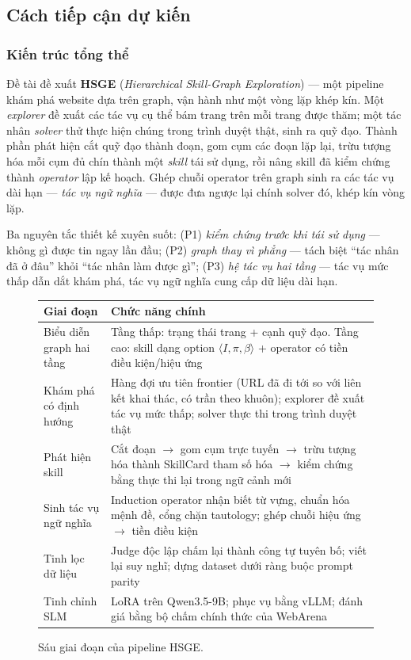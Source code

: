 \documentclass[14pt]{article}
\begin{document}
\subsection{Cách tiếp cận dự kiến}

\subsubsection{Kiến trúc tổng thể}

Đề tài đề xuất \textbf{HSGE} (\textit{Hierarchical Skill-Graph Exploration}) --- một pipeline khám phá website dựa trên graph, vận hành như một vòng lặp khép kín. Một \textit{explorer} đề xuất các tác vụ cụ thể bám trang trên mỗi trang được thăm; một tác nhân \textit{solver} thử thực hiện chúng trong trình duyệt thật, sinh ra quỹ đạo. Thành phần phát hiện cắt quỹ đạo thành đoạn, gom cụm các đoạn lặp lại, trừu tượng hóa mỗi cụm đủ chín thành một \textit{skill} tái sử dụng, rồi nâng skill đã kiểm chứng thành \textit{operator} lập kế hoạch. Ghép chuỗi operator trên graph sinh ra các tác vụ dài hạn --- \textit{tác vụ ngữ nghĩa} --- được đưa ngược lại chính solver đó, khép kín vòng lặp.

Ba nguyên tắc thiết kế xuyên suốt: (P1) \textit{kiểm chứng trước khi tái sử dụng} --- không gì được tin ngay lần đầu; (P2) \textit{graph thay vì phẳng} --- tách biệt ``tác nhân đã ở đâu'' khỏi ``tác nhân làm được gì''; (P3) \textit{hệ tác vụ hai tầng} --- tác vụ mức thấp dẫn dắt khám phá, tác vụ ngữ nghĩa cung cấp dữ liệu dài hạn.

\begin{figure}[H]
\centering
\small
\begin{tabular}{L{3.6cm} L{9.4cm}}
\toprule
\textbf{Giai đoạn} & \textbf{Chức năng chính} \\
\midrule
Biểu diễn graph hai tầng & Tầng thấp: trạng thái trang + cạnh quỹ đạo. Tầng cao: skill dạng option $\langle I, \pi, \beta \rangle$ + operator có tiền điều kiện/hiệu ứng \\
\addlinespace
Khám phá có định hướng & Hàng đợi ưu tiên frontier (URL đã đi tới so với liên kết khai thác, có trần theo khuôn); explorer đề xuất tác vụ mức thấp; solver thực thi trong trình duyệt thật \\
\addlinespace
Phát hiện skill & Cắt đoạn $\rightarrow$ gom cụm trực tuyến $\rightarrow$ trừu tượng hóa thành SkillCard tham số hóa $\rightarrow$ kiểm chứng bằng thực thi lại trong ngữ cảnh mới \\
\addlinespace
Sinh tác vụ ngữ nghĩa & Induction operator nhận biết từ vựng, chuẩn hóa mệnh đề, cổng chặn tautology; ghép chuỗi hiệu ứng $\rightarrow$ tiền điều kiện \\
\addlinespace
Tinh lọc dữ liệu & Judge độc lập chấm lại thành công tự tuyên bố; viết lại suy nghĩ; dựng dataset dưới ràng buộc prompt parity \\
\addlinespace
Tinh chỉnh SLM & LoRA trên Qwen3.5-9B; phục vụ bằng vLLM; đánh giá bằng bộ chấm chính thức của WebArena \\
\bottomrule
\end{tabular}
\caption{Sáu giai đoạn của pipeline HSGE.}
\end{figure}
\end{document}

